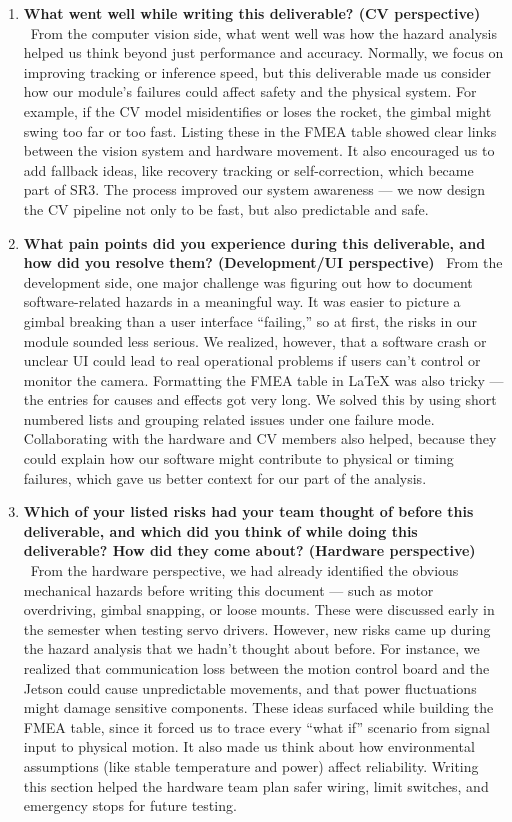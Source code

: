 \documentclass{article}
\begin{document}
\begin{enumerate}
  \item \textbf{What went well while writing this deliverable? (CV perspective)} \
        From the computer vision side, what went well was how the hazard analysis helped us think beyond just performance and accuracy. Normally, we focus on improving tracking or inference speed, but this deliverable made us consider how our module’s failures could affect safety and the physical system. For example, if the CV model misidentifies or loses the rocket, the gimbal might swing too far or too fast. Listing these in the FMEA table showed clear links between the vision system and hardware movement. It also encouraged us to add fallback ideas, like recovery tracking or self-correction, which became part of SR3. The process improved our system awareness — we now design the CV pipeline not only to be fast, but also predictable and safe.

  \item \textbf{What pain points did you experience during this deliverable, and how did you resolve them? (Development/UI perspective)} \
        From the development side, one major challenge was figuring out how to document software-related hazards in a meaningful way. It was easier to picture a gimbal breaking than a user interface “failing,” so at first, the risks in our module sounded less serious. We realized, however, that a software crash or unclear UI could lead to real operational problems if users can’t control or monitor the camera. Formatting the FMEA table in LaTeX was also tricky — the entries for causes and effects got very long. We solved this by using short numbered lists and grouping related issues under one failure mode. Collaborating with the hardware and CV members also helped, because they could explain how our software might contribute to physical or timing failures, which gave us better context for our part of the analysis.

  \item \textbf{Which of your listed risks had your team thought of before this deliverable, and which did you think of while doing this deliverable? How did they come about? (Hardware perspective)} \
        From the hardware perspective, we had already identified the obvious mechanical hazards before writing this document — such as motor overdriving, gimbal snapping, or loose mounts. These were discussed early in the semester when testing servo drivers. However, new risks came up during the hazard analysis that we hadn’t thought about before. For instance, we realized that communication loss between the motion control board and the Jetson could cause unpredictable movements, and that power fluctuations might damage sensitive components. These ideas surfaced while building the FMEA table, since it forced us to trace every “what if” scenario from signal input to physical motion. It also made us think about how environmental assumptions (like stable temperature and power) affect reliability. Writing this section helped the hardware team plan safer wiring, limit switches, and emergency stops for future testing.


\end{enumerate}
\end{document}
